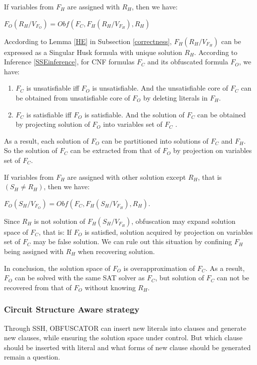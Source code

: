 \documentclass[conference,compsocconf]{IEEEtran}
\begin{document}
If variables from $F_H$ are assigned with $R_H$, then we have:

$F_O(R_H/V_{F_O})
=Obf(F_C,F_H(R_H/V_{F_H}),R_H)$ 

Accdording to Lemma \ref{HE} in Subsection \ref{correctness}, 
$F_H(R_H/V_{F_H})$ can be expressed as a Singular Husk formula with unique solution $R_H$.
According to Inference \ref{SSEinference}, for CNF formulas $F_C$  and its obfuscated formula $F_O$, we have:
\begin{enumerate}
 \item $F_C$  is unsatisfiable iff $F_O$ is unsatisfiable.
 And the unsatisfiable core of $F_C$  can be obtained from unsatisfiable core of $F_O$ by deleting literals in $F_H$.
 \item $F_C$  is satisfiable iff $F_O$ is satisfiable.
 And the solution of $F_C$  can be obtained by projecting solution of $F_O$ into variables set of $F_C$ .
\end{enumerate}

As a result, each solution of $F_O$ can be partitioned into solutions of $F_C$ and $F_H$. So
the solution of $F_C$ can be extracted from that of $F_O$ by projection on variables set of $F_C$.

If variables from $F_H$ are assigned with other solution except $R_H$, that is $(S_H\neq R_H)$, then we have:

$F_O(S_H/V_{F_O})
=Obf(F_C,F_H(S_H/V_{F_H}),R_H)$.

Since $R_H$ is not solution of $F_H(S_H/V_{F_H})$, obfuscation may expand solution space of $F_C$, that is:
If $F_O$ is satisfied, solution acquired by projection on variables set of $F_C$ may be false solution.
We can rule out this situation by confining $F_H$ being assigned with $R_H$ when recovering solution.

In conclusion, the solution space of $F_O$ is overapproximation of $F_C$.
As a result,
$F_O$ can be solved with the same SAT solver as $F_C$, 
but solution of $F_C$ can not be recovered from that of $F_O$ without knowing $R_H$.

\subsubsection{Circuit Structure Aware strategy}\label{embeded strategy}
Through SSH, OBFUSCATOR can insert new literals into clauses and generate new clauses, 
while ensuring the solution space under control.
But which clause should be inserted with literal and what forms of new clause should be generated remain a question.
\end{document}

